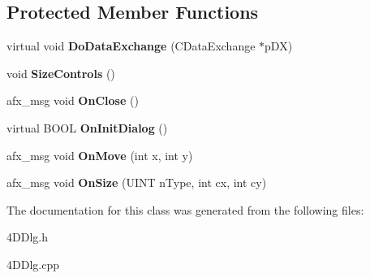 \subsection*{Protected Member Functions}
\begin{DoxyCompactItemize}
\item 
\hypertarget{class_c4_d_dlg_ab64f8de8de1b0177cc600794a8119c30}{virtual void {\bfseries Do\-Data\-Exchange} (C\-Data\-Exchange $\ast$p\-D\-X)}\label{class_c4_d_dlg_ab64f8de8de1b0177cc600794a8119c30}

\item 
\hypertarget{class_c4_d_dlg_ab2e7670e50a8bd193b8cacc49f456110}{void {\bfseries Size\-Controls} ()}\label{class_c4_d_dlg_ab2e7670e50a8bd193b8cacc49f456110}

\item 
\hypertarget{class_c4_d_dlg_a248d8588b0ad1c4bb9bad6b94312ac59}{afx\-\_\-msg void {\bfseries On\-Close} ()}\label{class_c4_d_dlg_a248d8588b0ad1c4bb9bad6b94312ac59}

\item 
\hypertarget{class_c4_d_dlg_a678da60ad925a976c1e63a120e6cb170}{virtual B\-O\-O\-L {\bfseries On\-Init\-Dialog} ()}\label{class_c4_d_dlg_a678da60ad925a976c1e63a120e6cb170}

\item 
\hypertarget{class_c4_d_dlg_acd45c8af87b436d56f5c9b1af41ef3a4}{afx\-\_\-msg void {\bfseries On\-Move} (int x, int y)}\label{class_c4_d_dlg_acd45c8af87b436d56f5c9b1af41ef3a4}

\item 
\hypertarget{class_c4_d_dlg_acffffcbb07671b1e8b647121d37b2f16}{afx\-\_\-msg void {\bfseries On\-Size} (U\-I\-N\-T n\-Type, int cx, int cy)}\label{class_c4_d_dlg_acffffcbb07671b1e8b647121d37b2f16}

\end{DoxyCompactItemize}


The documentation for this class was generated from the following files\-:\begin{DoxyCompactItemize}
\item 
4\-D\-Dlg.\-h\item 
4\-D\-Dlg.\-cpp\end{DoxyCompactItemize}
